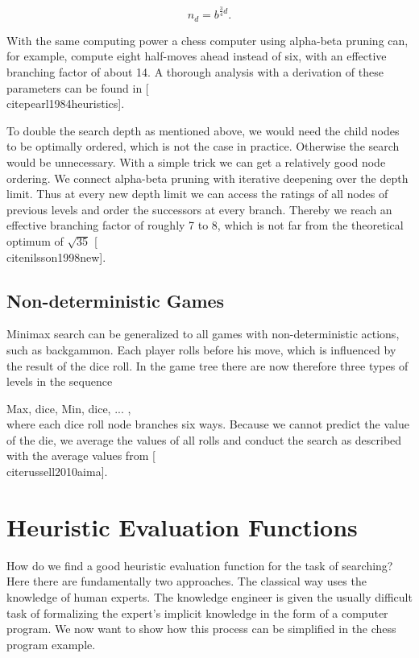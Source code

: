 \documentclass[10pt]{book}
\begin{document}
$$
n_{d}=b^{\frac{3}{4} d} .
$$

With the same computing power a chess computer using alpha-beta pruning can, for example, compute eight half-moves ahead instead of six, with an effective branching factor of about 14. A thorough analysis with a derivation of these parameters can be found in [\\cite{pearl1984heuristics}].

To double the search depth as mentioned above, we would need the child nodes to be optimally ordered, which is not the case in practice. Otherwise the search would be unnecessary. With a simple trick we can get a relatively good node ordering. We connect alpha-beta pruning with iterative deepening over the depth limit. Thus at every new depth limit we can access the ratings of all nodes of previous levels and order the successors at every branch. Thereby we reach an effective branching factor of roughly 7 to 8, which is not far from the theoretical optimum of $\sqrt{35}$ [\\cite{nilsson1998new}].

\subsection{Non-deterministic Games}
Minimax search can be generalized to all games with non-deterministic actions, such as backgammon. Each player rolls before his move, which is influenced by the result of the dice roll. In the game tree there are now therefore three types of levels in the sequence

Max, dice, Min, dice, ... ,\\[0pt]
where each dice roll node branches six ways. Because we cannot predict the value of the die, we average the values of all rolls and conduct the search as described with the average values from [\\cite{russell2010aima}].

\section{Heuristic Evaluation Functions}
How do we find a good heuristic evaluation function for the task of searching? Here there are fundamentally two approaches. The classical way uses the knowledge of human experts. The knowledge engineer is given the usually difficult task of formalizing the expert's implicit knowledge in the form of a computer program. We now want to show how this process can be simplified in the chess program example.
\end{document}
